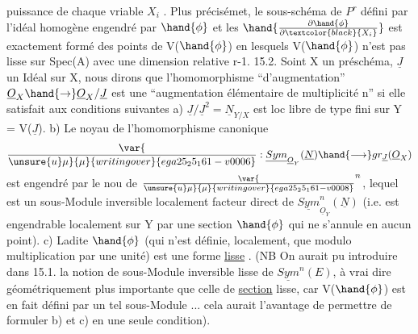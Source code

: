 
puissance de chaque vriable $X_i$ . Plus précisémet, le sous-schéma
de $P^r$ défini par l'idéal homogène engendré par  $\hand{\phi}$ et les $\hand{\frac{\partial\hand{\phi}}{\partial\textcolor{black}{X_i}}}$ est
exactement formé des points de V($\hand{\phi}$) en lesquels V($\hand{\phi}$) n'est pas lisse sur
Spec(A) avec une dimension relative r-1.
15.2. Soint X un préschéma, $\underline{J}$ un Idéal   sur X, nous dirons que
l'homomorphisme ``d'augmentation'' $\underline{O}_X \hand{\to} \underline{O}_X/\underline{J}$ est une ``augmentation
élémentaire de multiplicité n'' si elle satisfait aux conditions suivantes
a) $\underline{J}/\underline{J}^2 = \underline{N}_{Y/X}$ est loc libre de type fini sur Y = V($\underline{J}$).
b) Le noyau de l'homomorphisme canonique
\[ \var{\over{\unsure{u}}{\mu}}{\mu}{writing over}{ega25_25_161-v0006} : \underline{Sym}_{\underline{O}_Y}(\underline{N}) \hand{\longrightarrow} gr_{\underline{J}}(\underline{O}_X) \]
est engendré par le nou  de $\var{\over{\unsure{u}}{\mu}}{\mu}{writing over}{ega25_25_161-v0008}^n$, lequel est un sous-Module inversible
localement facteur direct de $\underline{Sym}^n_{\underline{O}_Y}(\underline{N})$ (i.e. est engendrable localement
sur Y par une section $\hand{\phi}$ qui ne s'annule en aucun point).
c) Ladite $\hand{\phi}$ (qui n'est définie, localement, que modulo multiplication
par une unité) est une forme \uline{lisse} . (NB On aurait pu introduire dans
15.1. la notion de sous-Module inversible lisse de $\underline{Sym}^n(E)$, à vrai dire
géométriquement plus importante que celle de \uline{section} lisse, car V($\hand{\phi}$) est
en fait défini par un tel sous-Module ... cela aurait l'avantage de
permettre de formuler b) et c) en une seule condition).

